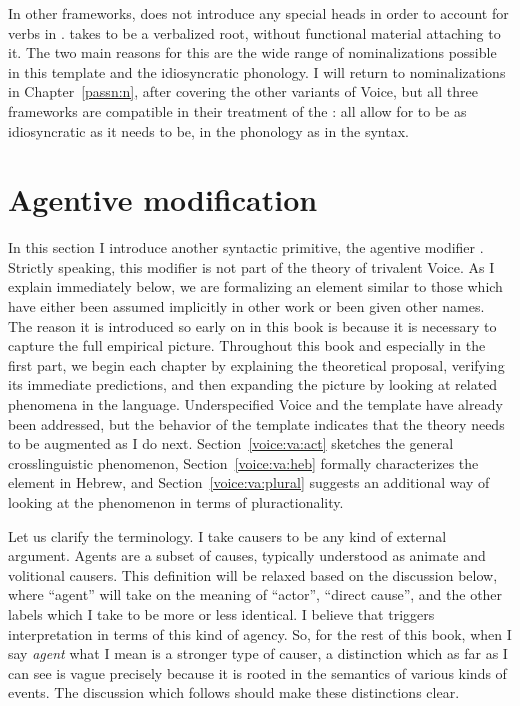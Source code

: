 In other frameworks, \cite{doron03} does not introduce any special heads in order to account for verbs in {\tkal}. \cite{borer13oup,borer15roots} takes {\tkal} to be a verbalized root, without functional material attaching to it. The two main reasons for this are the wide range of nominalizations possible in this template and the idiosyncratic phonology. I will return to nominalizations in Chapter~\ref{passn:n}, after covering the other variants of Voice, but all three frameworks are compatible in their treatment of the {\tkal}: all allow for {\tkal} to be as idiosyncratic as it needs to be, in the phonology as in the syntax.


\section{Agentive modification} \label{voice:va}
In this section I introduce another syntactic primitive, the agentive modifier {\va}. Strictly speaking, this modifier is not part of the theory of trivalent Voice. As I explain immediately below, we are formalizing an element similar to those which have either been assumed implicitly in other work or been given other names. The reason it is introduced so early on in this book is because it is necessary to capture the full empirical picture. Throughout this book and especially in the first part, we begin each chapter by explaining the theoretical proposal, verifying its immediate predictions, and then expanding the picture by looking at related phenomena in the language. Underspecified Voice and the template {\tkal} have already been addressed, but the behavior of the template {\tpie} indicates that the theory needs to be augmented as I do next. Section~\ref{voice:va:act} sketches the general crosslinguistic phenomenon, Section~\ref{voice:va:heb} formally characterizes the element {\va} in Hebrew, and Section~\ref{voice:va:plural} suggests an additional way of looking at the phenomenon in terms of pluractionality.

Let us clarify the terminology. I take causers to be any kind of external argument. Agents are a subset of causes, typically understood as animate and volitional causers. This definition will be relaxed based on the discussion below, where ``agent'' will take on the meaning of ``actor'', ``direct cause'', and the other labels which I take to be more or less identical. I believe that {\va} triggers interpretation in terms of this kind of agency. So, for the rest of this book, when I say \emph{agent} what I mean is a stronger type of causer, a distinction which as far as I can see is vague precisely because it is rooted in the semantics of various kinds of events. The discussion which follows should make these distinctions clear.

